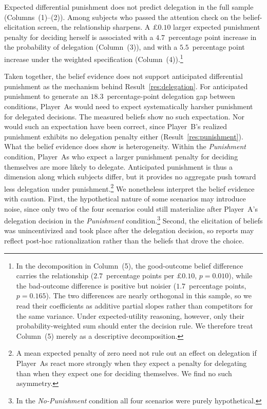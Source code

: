 \begingroup
\setlength{\tabcolsep}{5pt}

\endgroup

Expected differential punishment does not predict delegation in the full sample (Columns~(1)--(2)). Among subjects who passed the attention check on the belief-elicitation screen, the relationship sharpens. A $\pounds 0.10$ larger expected punishment penalty for deciding herself is associated with a $4.7$~percentage point increase in the probability of delegation (Column~(3)), and with a $5.5$~percentage point increase under the weighted specification (Column~(4)).\footnote{In the decomposition in Column~(5), the good-outcome belief difference carries the relationship ($2.7$~percentage points per $\pounds 0.10$, $p=0.010$), while the bad-outcome difference is positive but noisier ($1.7$~percentage points, $p=0.165$). The two differences are nearly orthogonal in this sample, so we read their coefficients as additive partial slopes rather than competitors for the same variance. Under expected-utility reasoning, however, only their probability-weighted sum should enter the decision rule. We therefore treat Column~(5) merely as a descriptive decomposition. %
}

Taken together, the belief evidence does not support anticipated differential punishment as the mechanism behind Result~\ref{res:delegation}. For anticipated punishment to generate an $18.3$~percentage-point delegation gap between conditions, Player~As would need to expect systematically harsher punishment for delegated decisions. The measured beliefs show no such expectation. Nor would such an expectation have been correct, since Player~B's realized punishment exhibits no delegation penalty either (Result~\ref{res:punishment}). What the belief evidence does show is heterogeneity. Within the \textit{Punishment} condition, Player~As who expect a larger punishment penalty for deciding themselves are more likely to delegate. Anticipated punishment is thus a dimension along which subjects differ, but it provides no aggregate push toward less delegation under punishment.\footnote{A mean expected penalty of zero need not rule out an effect on delegation if Player~As react more strongly when they expect a penalty for delegating than when they expect one for deciding themselves. We find no such asymmetry.} We nonetheless interpret the belief evidence with caution. First, the hypothetical nature of some scenarios may introduce noise, since only two of the four scenarios could still materialize after Player~A's delegation decision in the \textit{Punishment} condition.\footnote{In the \textit{No-Punishment} condition all four scenarios were purely hypothetical.} Second, the elicitation of beliefs was unincentivized and took place after the delegation decision, so reports may reflect post-hoc rationalization rather than the beliefs that drove the choice.

